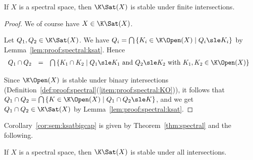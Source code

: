 \begin{lemma}
\label{lem:proof:spectral:coh}
If $X$ is a spectral space, then $\K\Sat(X)$ is stable under finite
intersections.
\end{lemma}

\begin{proof}
We of course have $X \in \K\Sat(X)$.

Let $Q_1, Q_2 \in \K\Sat(X)$.
We have
$Q_i = \bigcap \left\{ K_i \in \K\Open(X) \mid Q_i \sle K_i \right\}$
by Lemma~\ref{lem:proof:spectral:ksat}.
Hence
\[
\begin{array}{l l l}
  Q_1 \cap Q_2
& =
& \bigcap \left\{
  K_1 \cap K_2
  \mid
  \text{$Q_1 \sle K_1$ and $Q_2 \sle K_2$ with $K_1,K_2 \in \K\Open(X)$}
  \right\}
\end{array}
\]

Since $\K\Open(X)$ is stable under binary intersections
(Definition~\ref{def:proof:spectral}(\ref{item:proof:spectral:KO})),
it follows that
$Q_1 \cap Q_2 = \bigcap \left\{ K \in \K\Open(X) \mid Q_1 \cap Q_2 \sle K \right\}$,
and we get $Q_1 \cap Q_2 \in \K\Sat(X)$
by Lemma~\ref{lem:proof:spectral:ksat}.
\end{proof}

Corollary~\ref{cor:sem:ksatbigcap} is given by Theorem~\ref{thm:spectral}
and the following.


\begin{corollary}
\label{cor:proof:spectral:ksatbigcap}
If $X$ is a spectral space, then $\K\Sat(X)$ is stable under all intersections.
\end{corollary}

